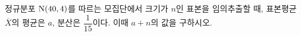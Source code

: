 정규분포 $\mathrm{N}(40{,}\mkern3mu\mathopen{}4)$를 따르는 모집단에서 크기가 $n$인 표본을 임의추출할 때, 표본평균 $\overline{X}$의 평균은 $a$, 분산은 $\dfrac{1}{15}$이다. 이때 $a+n$의 값을 구하시오.
